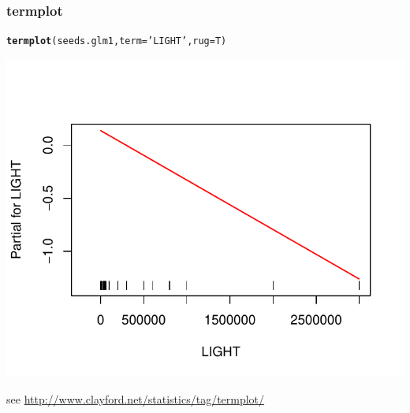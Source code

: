\documentclass[handout]{beamer}\usepackage[]{graphicx}\usepackage[]{color}
\makeatletter
\def\maxwidth{ %
  \ifdim\Gin@nat@width>\linewidth
    \linewidth
  \else
    \Gin@nat@width
  \fi
}
\newcommand{\hlstr}[1]{\textcolor[rgb]{0.192,0.494,0.8}{#1}}%
\newcommand{\hlstd}[1]{\textcolor[rgb]{0.345,0.345,0.345}{#1}}%
\newcommand{\hlkwc}[1]{\textcolor[rgb]{0.333,0.667,0.333}{#1}}%
\newcommand{\hlkwd}[1]{\textcolor[rgb]{0.737,0.353,0.396}{\textbf{#1}}}%
\newenvironment{kframe}{%
 \def\at@end@of@kframe{}%
 \ifinner\ifhmode%
  \def\at@end@of@kframe{\end{minipage}}%
  \begin{minipage}{\columnwidth}%
 \fi\fi%
 \def\FrameCommand##1{\hskip\@totalleftmargin \hskip-\fboxsep
 \colorbox{shadecolor}{##1}\hskip-\fboxsep
     \hskip-\linewidth \hskip-\@totalleftmargin \hskip\columnwidth}%
 \MakeFramed {\advance\hsize-\width
   \@totalleftmargin\z@ \linewidth\hsize
   \@setminipage}}%
 {\par\unskip\endMakeFramed%
 \at@end@of@kframe}
\newenvironment{knitrout}{}{} %
\makeatother
\begin{document}
\begin{frame}[fragile]\frametitle{termplot}

\begin{knitrout}
\color{fgcolor}\begin{kframe}
\begin{alltt}
\hlkwd{termplot}\hlstd{(seeds.glm1,} \hlkwc{term}\hlstd{=}\hlstr{'LIGHT'}\hlstd{,} \hlkwc{rug}\hlstd{=T)}
\end{alltt}
\end{kframe}
\includegraphics[width=\maxwidth]{figure/termplot-1} 

\end{knitrout}

see \url{http://www.clayford.net/statistics/tag/termplot/}
\end{frame}
\end{document}
